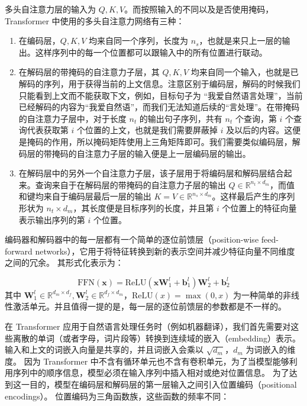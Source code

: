 多头自注意力层的输入为 $Q,K,V$。而按照输入的不同以及是否使用掩码，Transformer 中使用的多头自注意力网络有三种：

\begin{enumerate}[(1)]
	\item 在编码层，$Q,K,V$ 均来自同一个序列，长度为 $n_s$，也就是来只上一层的输出。这样序列中的每一个位置都可以跟输入中的所有位置进行联动。
	\item 在解码层的带掩码的自注意力子层，其 $Q,K,V$ 均来自同一个输入，也就是已解码的序列，用于获得当前的上文信息。注意区别于编码层，解码的时候我们只能看到上文而不能获取下文，例如，目标句子为 “我爱自然语言处理”，当前已经解码的内容为“我爱自然语”，而我们无法知道后续的“言处理”。在带掩码的自注意力子层中，对于长度 $n_t$ 的输出句子序列，共有 $n_t$ 个查询，第 $i$ 个查询代表获取第 $i$ 个位置的上文，也就是我们需要屏蔽掉 $i$ 及以后的内容。这便是掩码的作用，所以掩码矩阵使用上三角矩阵即可。我们需要类似编码层，解码层的带掩码的自注意力子层的输入便是上一层编码层的输出。
	\item 在解码层中的另外一个自注意力子层，该子层用于将编码层和解码层结合起来。查询来自于在解码层的带掩码的自注意力子层的输出 $Q \in \mathbb{R}^{n_t \times d_m}$，而值和键均来自于编码层最后一层的输出 $K = V \in \mathbb{R}^{n_s \times d_m}$。这样最后产生的序列形状为 $n_t \times d_m$，其长度便是目标序列的长度，并且第 $i$ 个位置上的特征向量表示输出序列的第 $i$ 个位置。
\end{enumerate}

编码器和解码器中的每一层都有一个简单的逐位前馈层（position-wise feed-forward networks），它用于将特征转换到新的表示空间并减少特征向量不同维度之间的冗余。
其形式化表示为：

\begin{equation}
	\text{FFN}(\bm{x}) = \text{ReLU}(\bm{x} \bm{W}_1^{l} + \bm{b}_1^{l}) \bm{W}_2^{l} + \bm{b}_2^{l}
\end{equation}
其中 $\bm{W}_1^{l} \in \mathbb{R}^{d_m \times d_f}, \bm{W}_2^{l} \in \mathbb{R}^{d_f \times d_m}$，$\text{ReLU}(x) = \max(0, x)$ 为一种简单的非线性激活单元。并且值得一提的是，每一层的逐位前馈层的参数都是不一样的。

在 Transformer 应用于自然语言处理任务时（例如机器翻译），我们首先需要对这些离散的单词（或者字母，词片段等）转换到连续域的嵌入（embedding）表示。
输入和上文的词嵌入向量是共享的，并且词嵌入会乘以 $\sqrt{d_m}$，$d_m$ 为词嵌入的维度。
因为 Transformer 中不含有循环单元也不含有卷积单元，为了当模型能够利用序列中的顺序信息，模型必须在输入序列中插入相对或绝对位置信息。
为了达到这一目的，模型在编码层和解码层的第一层输入之间引入位置编码（positional encodings）。
位置编码为三角函数族，这些函数的频率不同：

